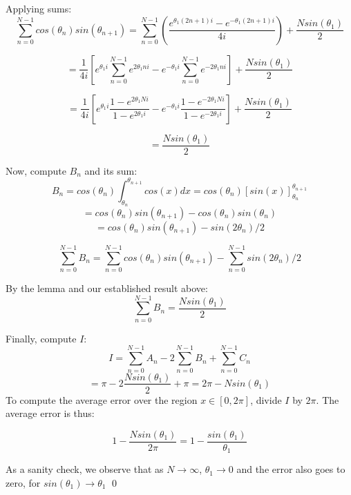 \documentclass{article}
\def\th{{\theta}}
\begin{document}
Applying sums:
\[
    \sum_{n = 0}^{N-1}
 cos(\th_n)sin(\th_{n+1})
  = \sum_{n = 0}^{N-1}
\left(
\frac{e^{\th_1(2n+1)i}
        -e^{-\th_1(2n+1)i}
    }
    {4i}
\right)
+\frac{Nsin(\th_1)}{2}
\]

\[
    =
    \frac{1}{4i}
    \left[
    e^{\th_1i}
    \sum_{n = 0}^{N-1}
    e^{2\th_1ni}
    -
    e^{-\th_1i}
    \sum_{n = 0}^{N-1}
    e^{-2\th_1ni}
    \right]
+\frac{Nsin(\th_1)}{2}
\]

\[
    =
    \frac{1}{4i}
    \left[
    e^{\th_1i}
    \frac{1-e^{2\th_1Ni}}
    {1-e^{2\th_1i}}
    -
    e^{-\th_1i}
    \frac{1-e^{-2\th_1Ni}}
    {1-e^{-2\th_1i}}
    \right]
+\frac{Nsin(\th_1)}{2}
\]

\[
    =\frac{Nsin(\th_1)}{2}
\]

Now, compute $B_n$ and its sum:
\[
    B_n = 
    cos(\th_n)
    \int_{\th_n}^{\th_{n+1}}
    cos(x)dx
    =cos(\th_n)\left[
        sin(x)
    \right]_{\th_n}^{\th_{n+1}}
\]
\[
    =cos(\th_n)sin(\th_{n+1})
    -cos(\th_n)sin(\th_{n})
    \]\[
    =cos(\th_n)sin(\th_{n+1})
    -sin(2\th_n)/2
\]

\[
    \sum_{n = 0}^{N-1}B_n =
     \sum_{n = 0}^{N-1}cos(\th_n)sin(\th_{n+1})
    -\sum_{n = 0}^{N-1}sin(2\th_n)/2
\]

By the lemma and our established result above:
\[
    \sum_{n = 0}^{N-1}B_n = 
    \frac{Nsin(\th_1)}{2}
\]

Finally, compute $I$:
\[
     I 
     = \sum_{n = 0}^{N-1} A_n 
     -2\sum_{n = 0}^{N-1} B_n 
     +\sum_{n = 0}^{N-1} C_n 
\]
\[
    =\pi-2\frac{Nsin(\th_1)}{2}+\pi = 2\pi - Nsin(\th_1)
\]
To compute the average error over the 
region $x \in [0, 2\pi]$, divide $I$ by 
$2\pi$. The average error is thus:

\[
    1-\frac{Nsin(\th_1)}{2\pi} = 1-\frac{sin(\th_1)}{\th_1}
\]

As a sanity check, we observe 
that as $N\rightarrow\infty$, 
$\th_1\rightarrow 0$ and the error 
also goes to zero, for $sin(\th_1)\rightarrow \th_1$
\qed
\end{document}
